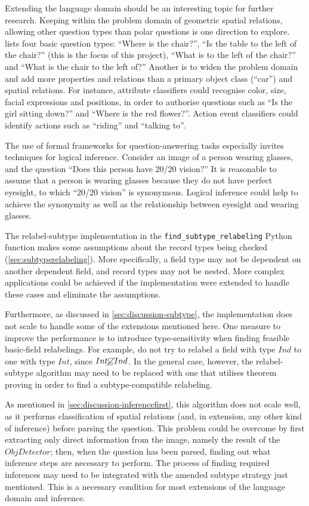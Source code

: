 Extending the language domain should be an interesting topic for further research.
Keeping within the problem domain of geometric spatial relations, allowing other question types than polar questions is one direction to explore.
\citet[p. 156]{DobnikTeachingmobilerobots2009} lists four basic question types:
``Where is the chair?'',
``Is the table to the left of the chair?'' (this is the focus of this project),
``What is to the left of the chair?'' and
``What is the chair to the left of?''
Another is to widen the problem domain and add more properties and relations than a primary object class (``car'') and spatial relations.
For instance, attribute classifiers could recognise color, size, facial expressions and positions, in order to authorise questions such as ``Is the girl sitting down?'' and ``Where is the red flower?''.
Action event classifiers could identify actions such as ``riding'' and ``talking to''.

The use of formal frameworks for question-answering tasks especially invites techniques for logical inference.
Consider an image of a person wearing glasses, and the question ``Does this person have 20/20 vision?''
It is reasonable to assume that a person is wearing glasses because they do not have perfect eyesight, to which ``20/20 vision'' is synonymous.
Logical inference could help to achieve the synonymity as well as the relationship between eyesight and wearing glasses.

The relabel-subtype implementation in the \texttt{find\_subtype\_relabeling} Python function makes some assumptions about the record types being checked (\autoref{sec:subtyperelabeling}).
More specifically, a field type may not be dependent on another dependent field, and record types may not be nested.
More complex applications could be achieved if the implementation were extended to handle these cases and eliminate the assumptions.

Furthermore, as discussed in \autoref{sec:discussion-subtype}, the implementation does not scale to handle some of the extensions mentioned here.
One measure to improve the performance is to introduce type-sensitivity when finding feasible basic-field relabelings.
For example, do not try to relabel a field with type $Ind$ to one with type $Int$, since $Int \cancel\sqsubseteq Ind$.
In the general case, however, the relabel-subtype algorithm may need to be replaced with one that utilises theorem proving in order to find a subtype-compatible relabeling.

As mentioned in \autoref{sec:discussion-inferencefirst}, this algorithm does not scale well, as it performs classification of spatial relations (and, in extension, any other kind of inference) before parsing the question.
This problem could be overcome by first extracting only direct information from the image, namely the result of the $ObjDetector$;
then, when the question has been parsed, finding out what inference steps are necessary to perform.
The process of finding required inferences may need to be integrated with the amended subtype strategy just mentioned.
This is a necessary condition for most extensions of the language domain and inference.


